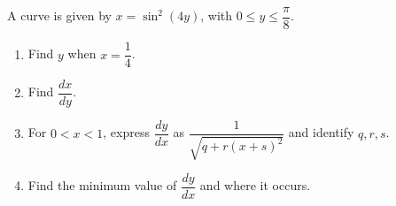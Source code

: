 A curve is given by $x=\sin^2(4y)$, with $0\le y\le\dfrac{\pi}{8}$.
\begin{enumerate}\item Find $y$ when $x=\dfrac{1}{4}$.
\item Find $\dfrac{dx}{dy}$.
\item For $0<x<1$, express $\dfrac{dy}{dx}$ as $\dfrac{1}{\sqrt{q+r(x+s)^2}}$ and identify $q,r,s$.
\item Find the minimum value of $\dfrac{dy}{dx}$ and where it occurs.\end{enumerate}
